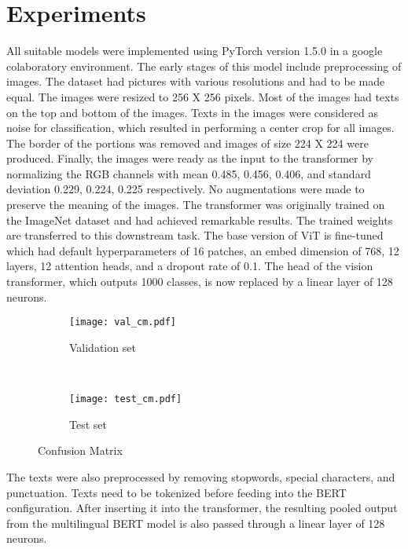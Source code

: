 \documentclass[11pt,a4paper]{article}
\begin{document}
\section{Experiments}
\label{experiments}
 All suitable models were implemented using PyTorch version 1.5.0 in a google colaboratory environment. The early stages of this model include preprocessing of images. The dataset had pictures with various resolutions and had to be made equal. The images were resized to 256 X 256 pixels. Most of the images had texts on the top and bottom of the images. Texts in the images were considered as noise for classification, which resulted in performing a center crop for all images. The border of the portions was removed and images of size 224 X 224 were produced. Finally, the images were ready as the input to the transformer by normalizing the RGB channels with mean 0.485, 0.456, 0.406, and standard deviation 0.229, 0.224, 0.225 respectively. No augmentations were made to preserve the meaning of the images. The transformer was originally trained on the ImageNet dataset and had achieved remarkable results. The trained weights are transferred to this downstream task. The base version of ViT is fine-tuned which had default hyperparameters of 16 patches, an embed dimension of 768, 12 layers, 12 attention heads, and a dropout rate of 0.1. The head of the vision transformer, which outputs 1000 classes, is now replaced by a linear layer of 128 neurons. 
 \captionsetup[sub]{labelformat=simple} 
\renewcommand{\thesubfigure}{(\alph{subfigure})}
\begin{figure}[!hbt] 
    \centering 
    \begin{subfigure}[b]{0.9\linewidth}  
        \centering 
        \texttt{[image: val\_cm.pdf]} 
        \caption{Validation set} 
        \label{fig:1-1} 
    \end{subfigure} 
    \\ 
    \begin{subfigure}[b]{0.9\linewidth} 
        \centering 
        \texttt{[image: test\_cm.pdf]} 
        \caption{ Test set} 
        \label{fig:1-2} 
    \end{subfigure} 
    \caption{Confusion Matrix} 
    \label{fig:1}  
\end{figure} 
 The texts were also preprocessed by removing stopwords, special characters, and punctuation. Texts need to be tokenized before feeding into the BERT configuration. After inserting it into the transformer, the resulting pooled output from the multilingual BERT model is also passed through a linear layer of 128 neurons.  
 
\end{document}
